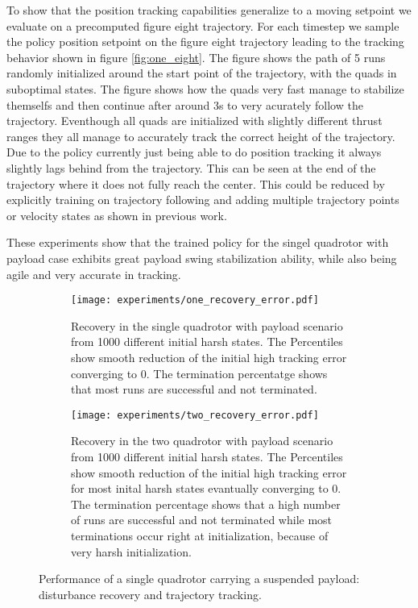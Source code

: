 To show that the position tracking capabilities generalize to a moving setpoint we evaluate on a precomputed figure eight trajectory. For each timestep we sample the policy position setpoint on the figure eight trajectory leading to the tracking behavior shown in figure \ref{fig:one_eight}. The figure shows the path of 5 runs randomly initialized around the start point of the trajectory, with the quads in suboptimal states. The figure shows how the quads very fast manage to stabilize themselfs and then continue after around 3s to very acurately follow the trajectory. Eventhough all quads are initialized with slightly different thrust ranges they all manage to accurately track the correct height of the trajectory.
Due to the policy currently just being able to do position tracking it always slightly lags behind from the trajectory. This can be seen at the end of the trajectory where it does not fully reach the center. This could be reduced by explicitly training on trajectory following and adding multiple trajectory points or velocity states as shown in previous work.

These experiments show that the trained policy for the singel quadrotor with payload case exhibits great payload swing stabilization ability, while also being agile and very accurate in tracking.


\begin{figure}[]
    \centering
    \begin{subfigure}[b]{0.49\textwidth}
        \centering
        
        \texttt{[image: experiments/one\_recovery\_error.pdf]}
        \caption{Recovery in the single quadrotor with payload scenario from 1000 different initial harsh states. The Percentiles show smooth reduction of the initial high tracking error converging to 0. The termination percentatge shows that most runs are successful and not terminated.}
        \label{fig:payload_error_over_time_single}
    \end{subfigure}
    \hfill
     \begin{subfigure}[b]{0.49\textwidth}
        \centering
        
        \texttt{[image: experiments/two\_recovery\_error.pdf]}
        \caption{Recovery in the two quadrotor with payload scenario from 1000 different initial harsh states. The Percentiles show smooth reduction of the initial high tracking error for most inital harsh states evantually converging to 0. The termination percentage shows that a high number of runs are successful and not terminated while most terminations occur right at initialization, because of very harsh initialization.}
        \label{fig:payload_error_over_time_two}
    \end{subfigure}
    \caption{Performance of a single quadrotor carrying a suspended payload: disturbance recovery and trajectory tracking.}
    \label{fig:single_quad_payload_subfigs}
\end{figure}



